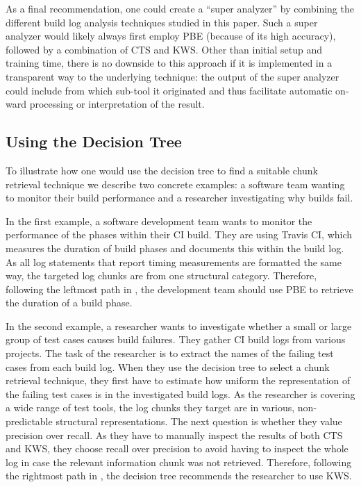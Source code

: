 As a final recommendation, one could create a ``super analyzer'' by
combining the different build log analysis techniques studied in this
paper.
Such a super analyzer would likely always first employ PBE
(because of its high accuracy), followed by a combination of CTS and
KWS\@.
Other than initial setup and training time, there is no
downside to this approach if it is implemented in a transparent way to
the underlying technique: the output of the super analyzer could
include from which sub-tool it originated and thus facilitate
automatic on-ward processing or interpretation of the result.


\subsection{Using the Decision Tree}
To illustrate how one would use the decision tree to find a suitable
chunk retrieval technique we describe two concrete examples: a software
team
wanting to monitor their build performance and a
researcher investigating why builds fail.

In the first example, a software development team wants to monitor
the performance of the phases within their CI build.
They are using
Travis CI, which measures the duration of build phases and documents
this within the build log.
As all log statements that report timing
measurements are formatted the same way, the targeted log chunks are
from one structural category.
Therefore, following the leftmost path in
,
the development team should use
PBE to retrieve the duration of a build phase.

In the second example, a researcher wants to investigate whether a small
or large group of test cases
causes build failures.
They gather
CI build logs from various projects.
The task of the researcher is to extract the names of the
failing test cases from each build log.
When they use the
decision tree to select a chunk retrieval technique, they
first have to estimate how uniform the representation of the failing
test cases is in the investigated build logs.
As the researcher is
covering a wide range of test tools, the
log chunks they target are in various, non-predictable structural
representations.
The next question is whether they value precision
over recall.
As they have to manually inspect the results of both CTS
and KWS, they choose recall over precision to avoid having to inspect
the whole log in case the relevant information chunk was not
retrieved.
Therefore, following the rightmost path in
,
the decision tree recommends the researcher to use KWS\@.


